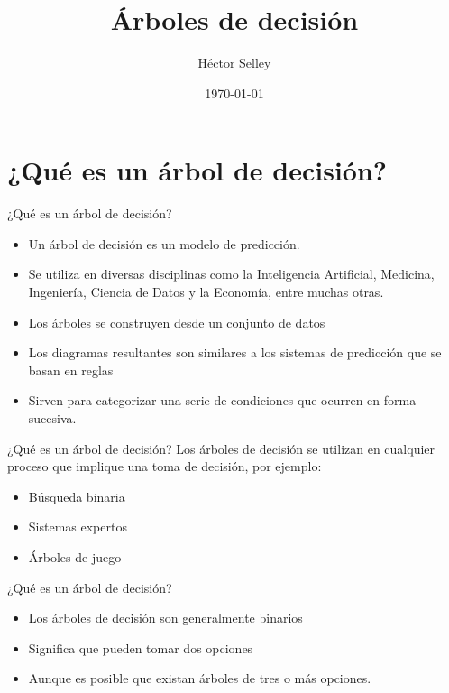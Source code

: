 \documentclass[11pt,aspectratio=169]{beamer}
\author{Héctor Selley}
\title{Árboles de decisión}
\institute{Universidad Anáhuac México}
\date{\today}
\begin{document}

\begin{frame}
	\titlepage
\end{frame}


\section{¿Qué es un árbol de decisión?}
\begin{frame}{¿Qué es un árbol de decisión?}
	\begin{itemize}\pause
		\item Un árbol de decisión es un modelo de predicción. \pause
		\item Se utiliza en diversas disciplinas como la Inteligencia Artificial, 
		Medicina, Ingeniería, Ciencia de Datos y la Economía, entre muchas otras. \pause
		\item Los árboles se construyen desde un conjunto de datos \pause 
		\item Los diagramas resultantes son similares a los sistemas de predicción que se basan
		en reglas \pause
		\item Sirven para categorizar una serie de condiciones que ocurren en forma sucesiva.
	\end{itemize}
\end{frame}

\begin{frame}{¿Qué es un árbol de decisión?}
	Los árboles de decisión se utilizan en cualquier proceso que implique una toma de decisión\pause, por ejemplo:\pause
	\begin{itemize}
		\item Búsqueda binaria \pause
		\item Sistemas expertos \pause
		\item Árboles de juego
	\end{itemize}	
\end{frame}

\begin{frame}{¿Qué es un árbol de decisión?}
	\begin{itemize}
		\item Los árboles de decisión son generalmente binarios \pause
		\item Significa que pueden tomar dos opciones \pause
		\item Aunque es posible que existan árboles de tres o más opciones.
	\end{itemize}
\end{frame}
\end{document}
